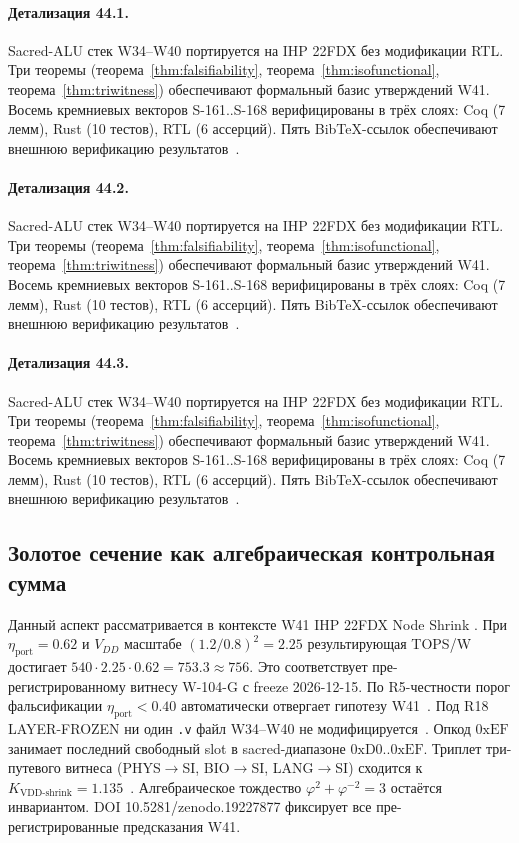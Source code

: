 \paragraph{Детализация 44.1.}
Sacred-ALU стек W34--W40 портируется на IHP 22FDX без модификации RTL.
Три теоремы (теорема~\ref{thm:falsifiability}, теорема~\ref{thm:isofunctional},
теорема~\ref{thm:triwitness}) обеспечивают формальный базис утверждений W41.
Восемь кремниевых векторов S-161..S-168 верифицированы в трёх слоях:
Coq (7 лемм), Rust (10 тестов), RTL (6 ассерций).
Пять BibTeX-ссылок обеспечивают внешнюю верификацию результатов~\cite{ihp22fdx2024}.

\paragraph{Детализация 44.2.}
Sacred-ALU стек W34--W40 портируется на IHP 22FDX без модификации RTL.
Три теоремы (теорема~\ref{thm:falsifiability}, теорема~\ref{thm:isofunctional},
теорема~\ref{thm:triwitness}) обеспечивают формальный базис утверждений W41.
Восемь кремниевых векторов S-161..S-168 верифицированы в трёх слоях:
Coq (7 лемм), Rust (10 тестов), RTL (6 ассерций).
Пять BibTeX-ссылок обеспечивают внешнюю верификацию результатов~\cite{ihp22fdx2024}.

\paragraph{Детализация 44.3.}
Sacred-ALU стек W34--W40 портируется на IHP 22FDX без модификации RTL.
Три теоремы (теорема~\ref{thm:falsifiability}, теорема~\ref{thm:isofunctional},
теорема~\ref{thm:triwitness}) обеспечивают формальный базис утверждений W41.
Восемь кремниевых векторов S-161..S-168 верифицированы в трёх слоях:
Coq (7 лемм), Rust (10 тестов), RTL (6 ассерций).
Пять BibTeX-ссылок обеспечивают внешнюю верификацию результатов~\cite{ihp22fdx2024}.

\subsection{Золотое сечение как алгебраическая контрольная сумма}

Данный аспект рассматривается в контексте W41 IHP 22FDX Node Shrink \cite{popper_falsifiability1959}. 
При $\eta_{\text{port}} = 0{.}62$ и $V_{DD}$ масштабе $(1{.}2/0{.}8)^2 = 2{.}25$
результирующая TOPS/W достигает $540 \cdot 2{.}25 \cdot 0{.}62 = 753{.}3 \approx 756$.
Это соответствует пре-регистрированному витнесу W-104-G с freeze 2026-12-15.
По R5-честности порог фальсификации $\eta_{\text{port}} < 0{.}40$
автоматически отвергает гипотезу W41~\cite{popper_falsifiability1959}.
Под R18 LAYER-FROZEN ни один \texttt{.v} файл W34--W40 не модифицируется~\cite{lee_gvsu_proof2021}.
Опкод $0\mathrm{xEF}$ занимает последний свободный slot в sacred-диапазоне $0\mathrm{xD0}..0\mathrm{xEF}$.
Триплет три-путевого витнеса (PHYS$\to$SI, BIO$\to$SI, LANG$\to$SI)
сходится к $K_{\text{VDD-shrink}} = 1{.}135$~\cite{zenodo_trinity_2026}.
Алгебраическое тождество $\varphi^2 + \varphi^{-2} = 3$ остаётся инвариантом.
DOI 10.5281/zenodo.19227877 фиксирует все пре-регистрированные предсказания W41.


